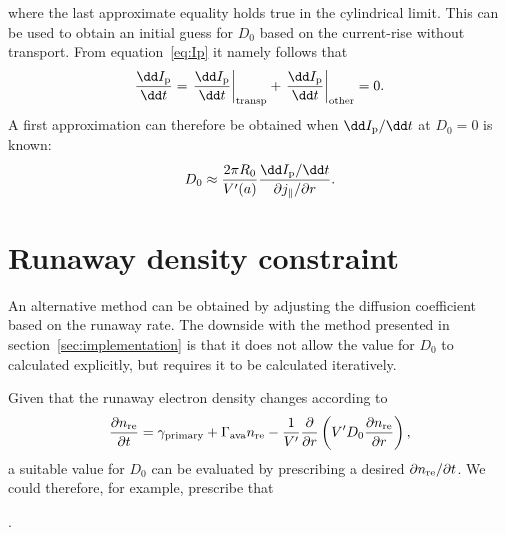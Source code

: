 \documentclass{notes}
\begin{document}
	where the last approximate equality holds true in the cylindrical limit.
	This can be used to obtain an initial guess for $D_0$ based on the
	current-rise without transport. From equation~\eqref{eq:Ip} it namely
	follows that
	\begin{equation}\label{eq:dIdt}
		\frac{\dd I_{\rm p}}{\dd t} =
			\left.\frac{\dd I_{\rm p}}{\dd t}\right|_{\rm transp} +
			\left.\frac{\dd I_{\rm p}}{\dd t}\right|_{\rm other}
			= 0.
	\end{equation}
	A first approximation can therefore be obtained when $\dd I_{\rm p}/\dd t$
	at $D_0=0$ is known:
	\begin{equation}\label{eq:D0app}
		D_0\approx \frac{2\pi R_0}{V'(a)}
			\frac{\dd I_{\rm p} / \dd t}
			{\partial j_\parallel/\partial r}.
	\end{equation}

	\section{Runaway density constraint}
	An alternative method can be obtained by adjusting the diffusion coefficient
	based on the runaway rate. The downside with the method presented in
	section~\ref{sec:implementation} is that it does not allow the value for
	$D_0$ to calculated explicitly, but requires it to be calculated
	iteratively.

	Given that the runaway electron density changes according to
	\begin{equation}
		\frac{\partial n_{\rm re}}{\partial t} =
			\gamma_{\rm primary} + \Gamma_{\rm ava}n_{\rm re} -
			\frac{1}{V'}\frac{\partial}{\partial r}\left(
				V' D_0 \frac{\partial n_{\rm re}}{\partial r}
			\right),
	\end{equation}
	a suitable value for $D_0$ can be evaluated by prescribing a desired
	$\partial n_{\rm re}/\partial t$. We could therefore, for example, prescribe
	that 

	.
\end{document}
